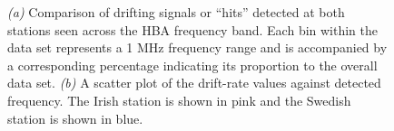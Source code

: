 \begin{figure} %
    \centering
    \qquad
    \caption{\textit{(a)} Comparison of drifting signals or “hits” detected at both stations seen across the HBA frequency band. Each bin within the data set represents a 1 MHz frequency range and is accompanied by a corresponding percentage indicating its proportion to the overall data set. \textit{(b)} A scatter plot of the drift-rate values against detected frequency. The Irish station is shown in pink and the Swedish station is shown in blue.}%
    \label{fig:hits-histogram}%
\end{figure}

